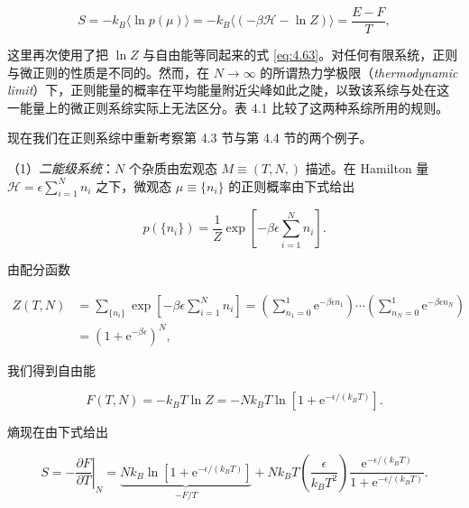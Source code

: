 \begin{equation}\label{eq:4.70}
  S=-k_B\langle\ln p(\mu)\rangle=-k_B\langle\left(-\beta\mathscr H-\ln Z\right)\rangle=\frac{E-F}{T},
\end{equation}

这里再次使用了把 $\ln Z$ 与自由能等同起来的式 \eqref{eq:4.63}。对任何有限系统，正则与微正则的性质是不同的。然而，在 $N\to\infty$ 的所谓热力学极限（\textit{thermodynamic limit}）下，正则能量的概率在平均能量附近尖峰如此之陡，以致该系综与处在这一能量上的微正则系综实际上无法区分。表 4.1 比较了这两种系综所用的规则。


现在我们在正则系综中重新考察第 4.3 节与第 4.4 节的两个例子。

（1）\emph{二能级系统}：$N$ 个杂质由宏观态 $M\equiv(T,N,)$ 描述。在 Hamilton 量 $\mathscr H=\epsilon\sum_{i=1}^N n_i$ 之下，微观态 $\mu\equiv\{n_i\}$ 的正则概率由下式给出

\begin{equation}\label{eq:4.71}
  p(\{n_i\})=\frac{1}{Z}\exp\left[-\beta\epsilon\sum_{i=1}^N n_i\right].
\end{equation}

由配分函数

\begin{equation}\label{eq:4.72}
  \begin{aligned}
    Z(T,N)&=\sum_{\{n_i\}}\exp\left[-\beta\epsilon\sum_{i=1}^N n_i\right]=\left(\sum_{n_1=0}^1\mathrm{e}^{-\beta\epsilon n_1}\right)\cdots\left(\sum_{n_N=0}^1\mathrm{e}^{-\beta\epsilon n_N}\right)\\
    &=\left(1+\mathrm{e}^{-\beta\epsilon}\right)^N,
  \end{aligned}
\end{equation}

我们得到自由能

\begin{equation}\label{eq:4.73}
  F(T,N)=-k_BT\ln Z=-Nk_BT\ln\left[1+\mathrm{e}^{-\epsilon/(k_BT)}\right].
\end{equation}

熵现在由下式给出

\begin{equation}\label{eq:4.74}
  S=\left.-\frac{\partial F}{\partial T}\right|_N=\underbrace{Nk_B\ln\left[1+\mathrm{e}^{-\epsilon/(k_BT)}\right]}_{-F/T}+Nk_BT\left(\frac{\epsilon}{k_BT^2}\right)\frac{\mathrm{e}^{-\epsilon/(k_BT)}}{1+\mathrm{e}^{-\epsilon/(k_BT)}}.
\end{equation}

